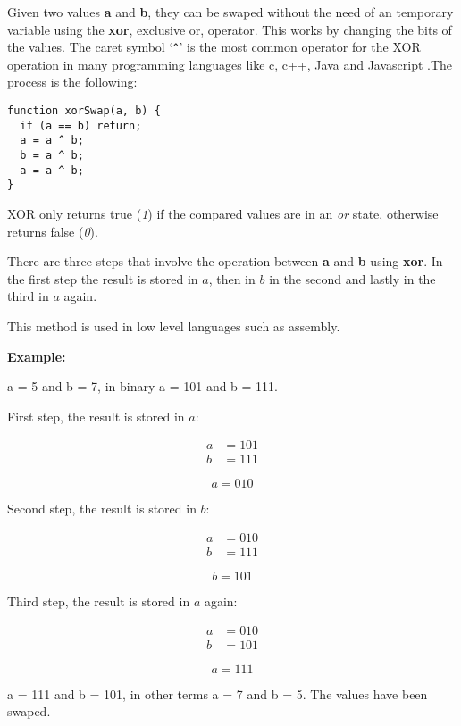 Given two values \textbf{a} and \textbf{b}, they can be swaped without the need of an temporary variable using the \textbf{xor}, exclusive or, operator. This works by changing the bits of the values. The caret symbol `\verb|^|' is the most common operator for the XOR operation in many programming languages like c, c++, Java and Javascript .The process is the following:

\begin{lstlisting}[style=general,caption=XOR swap]
function xorSwap(a, b) {
  if (a == b) return;
  a = a ^ b;
  b = a ^ b;
  a = a ^ b;
}
\end{lstlisting}

XOR only returns true (\emph{1}) if the compared values are in an \emph{or} state, otherwise returns false (\emph{0}).

There are three steps that involve the operation between \textbf{a} and \textbf{b} using \textbf{xor}. In the first step the result is stored in $a$, then in $b$ in the second and lastly in the third in $a$ again.

This method is used in low level languages such as assembly.

\textbf{Example:}

a = 5 and b = 7, in binary a = 101 and b = 111.

First step, the result is stored in $a$:

\begin{align*}
  a &= 101 \\
  b &= 111
\end{align*}

\[\boxed{
  a = 010
}\]

Second step, the result is stored in $b$:

\begin{align*}
  a &= 010 \\
  b &= 111
\end{align*}

\[\boxed{
  b = 101
}\]

Third step, the result is stored in $a$ again:

\begin{align*}
  a &= 010 \\
  b &= 101
\end{align*}

\[\boxed{
  a = 111
}\]

a = 111 and b = 101, in other terms a = 7 and b = 5. The values have been swaped.
